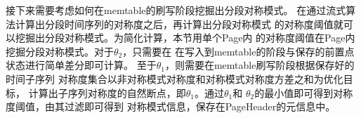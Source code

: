 接下来需要考虑如何在memtable的刷写阶段挖掘出分段对称模式。
在通过流式算法计算出分段时间序列的对称度之后，再计算出分段对称模式
的对称度阈值就可以挖掘出分段对称模式。为简化计算，本节用单个Page内
的对称度阈值在Page内挖掘分段对称模式。对于$\theta_2$，只需要在
在写入到memtable的阶段与保存的前置点状态进行简单差分即可计算。
至于$\theta_1$，则需要在memtable刷写阶段根据保存好的时间子序列
对称度集合以非对称模式对称度和对称模式对称度方差之和为优化目标，
计算出子序列对称度的自然断点，即$\theta_1$。通过$\theta_1$和
$\theta_2$的最小值即可得到对称度阈值，由其过滤即可得到
对称模式信息，保存在PageHeader的元信息中。










